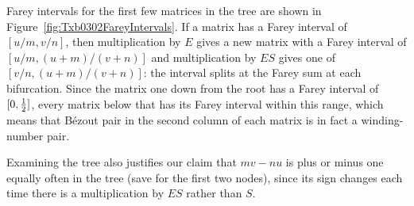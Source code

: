 Farey intervals for the first few matrices in the tree are shown in Figure~\ref{fig:Txb0302FareyIntervals}.%
%
%
If a matrix has a Farey interval of  $[u/m,v/n]$, then multiplication by $E$ gives a new matrix with a Farey interval of $[u/m,(u+m)/(v+n)]$ and multiplication by $ES$ gives one of  $[v/n,(u+m)/(v+n)]$: the interval splits at the Farey sum at each bifurcation. Since the matrix one down from the root has a Farey interval of $[0,\textstyle{\frac{1}{2}}]$, every matrix below that has its Farey interval within this range, which means that  B\'ezout pair in the second column of each matrix is in fact a winding-number pair.

 Examining the tree also justifies our claim that $m v-nu$ is plus or minus one equally often in the tree (save for the first two nodes), since its sign changes each time there is a multiplication by $ES$ rather than $S$.



